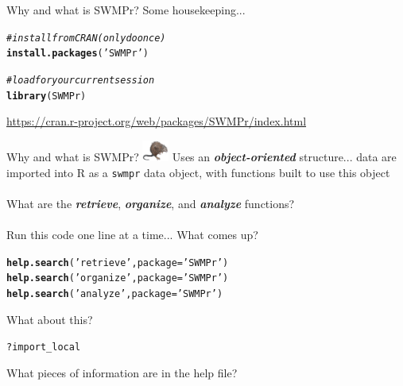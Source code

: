 \documentclass[xcolor=dvipsnames,serif]{beamer}\usepackage[]{graphicx}\usepackage[]{color}
\makeatletter
\newcommand{\hlstr}[1]{\textcolor[rgb]{0.192,0.494,0.8}{#1}}%
\newcommand{\hlcom}[1]{\textcolor[rgb]{0.678,0.584,0.686}{\textit{#1}}}%
\newcommand{\hlopt}[1]{\textcolor[rgb]{0,0,0}{#1}}%
\newcommand{\hlstd}[1]{\textcolor[rgb]{0.345,0.345,0.345}{#1}}%
\newcommand{\hlkwc}[1]{\textcolor[rgb]{0.333,0.667,0.333}{#1}}%
\newcommand{\hlkwd}[1]{\textcolor[rgb]{0.737,0.353,0.396}{\textbf{#1}}}%
\newenvironment{kframe}{%
 \def\at@end@of@kframe{}%
 \ifinner\ifhmode%
  \def\at@end@of@kframe{\end{minipage}}%
  \begin{minipage}{\columnwidth}%
 \fi\fi%
 \def\FrameCommand##1{\hskip\@totalleftmargin \hskip-\fboxsep
 \colorbox{shadecolor}{##1}\hskip-\fboxsep
     \hskip-\linewidth \hskip-\@totalleftmargin \hskip\columnwidth}%
 \MakeFramed {\advance\hsize-\width
   \@totalleftmargin\z@ \linewidth\hsize
   \@setminipage}}%
 {\par\unskip\endMakeFramed%
 \at@end@of@kframe}
\newenvironment{knitrout}{}{} %
\newcommand{\Bigtxt}[1]{\textbf{\textit{#1}}}
\makeatother
\begin{document}
\begin{frame}[fragile]{Why and what is SWMPr?}
Some housekeeping...
\begin{knitrout}\scriptsize
{}\color{fgcolor}\begin{kframe}
\begin{alltt}
\hlcom{# install from CRAN (only do once)}
\hlkwd{install.packages}\hlstd{(}\hlstr{'SWMPr'}\hlstd{)}

\hlcom{# load for your current session}
\hlkwd{library}\hlstd{(SWMPr)}
\end{alltt}
\end{kframe}
\end{knitrout}
\url{https://cran.r-project.org/web/packages/SWMPr/index.html}
\end{frame}

\begin{frame}[fragile]{Why and what is SWMPr? \includegraphics[width = 0.065\textwidth]{imgs/swmprat.png}}
\onslide<+->
Uses an \Bigtxt{object-oriented} structure... data are imported into R as a \texttt{swmpr} data object, with functions built to use this object\\~\\
What are the \Bigtxt{retrieve}, \Bigtxt{organize}, and \Bigtxt{analyze} functions? \\~\\
Run this code one line at a time... What comes up?
\begin{knitrout}\scriptsize
{}\color{fgcolor}\begin{kframe}
\begin{alltt}
\hlkwd{help.search}\hlstd{(}\hlstr{'retrieve'}\hlstd{,} \hlkwc{package} \hlstd{=} \hlstr{'SWMPr'}\hlstd{)}
\hlkwd{help.search}\hlstd{(}\hlstr{'organize'}\hlstd{,} \hlkwc{package} \hlstd{=} \hlstr{'SWMPr'}\hlstd{)}
\hlkwd{help.search}\hlstd{(}\hlstr{'analyze'}\hlstd{,} \hlkwc{package} \hlstd{=} \hlstr{'SWMPr'}\hlstd{)}
\end{alltt}
\end{kframe}
\end{knitrout}
\onslide<+->
What about this?
\begin{knitrout}\scriptsize
{}\color{fgcolor}\begin{kframe}
\begin{alltt}
\hlopt{?}\hlstd{import_local}
\end{alltt}
\end{kframe}
\end{knitrout}
What pieces of information are in the help file?
\end{frame}
\end{document}

